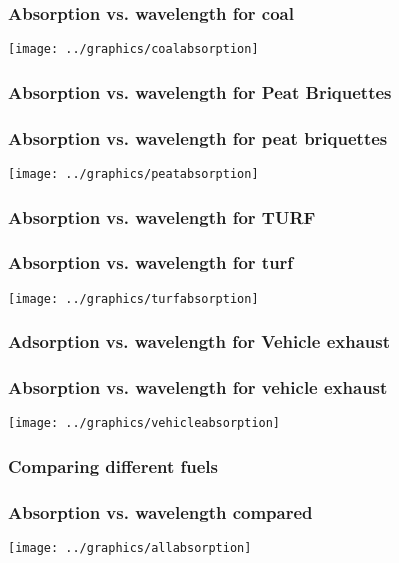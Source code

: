 ﻿\documentclass[ignorenonframetext]{beamer}
\begin{document}
\begin{frame}
\frametitle{Absorption vs. wavelength for coal}
\texttt{[image: ../graphics/coalabsorption]}
\end{frame}

 \subsubsection{Absorption vs. wavelength for Peat
Briquettes}\label{absorption-vs.-wavelength-for-peat-briquettes}

\begin{frame}
\frametitle{Absorption vs. wavelength for peat briquettes}
\texttt{[image: ../graphics/peatabsorption]}
\end{frame}

\subsubsection{Absorption vs. wavelength for
TURF}\label{absorption-vs.-wavelength-for-turf}

\begin{frame}
\frametitle{Absorption vs. wavelength for turf}
\texttt{[image: ../graphics/turfabsorption]}
\end{frame}

\subsubsection{Adsorption vs. wavelength for Vehicle
exhaust}\label{adsorption-vs.-wavelength-for-vehicle-exhaust}

\begin{frame}
\frametitle{Absorption vs. wavelength for vehicle exhaust}
\texttt{[image: ../graphics/vehicleabsorption]}
\end{frame}

\subsubsection{Comparing different
fuels}\label{comparing-different-fuels}

\begin{frame}
\frametitle{Absorption vs. wavelength compared}
\texttt{[image: ../graphics/allabsorption]}
\end{frame}
\end{document}
